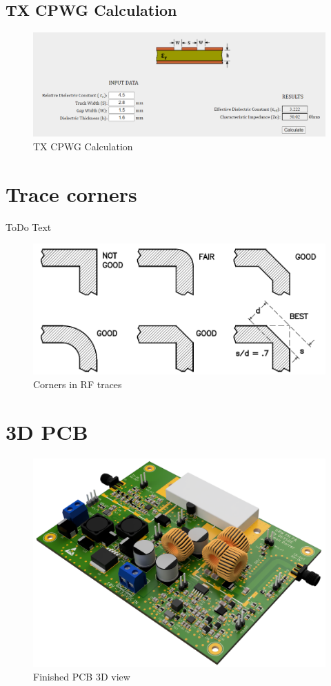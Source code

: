 \subsection{TX CPWG Calculation}
	\begin{figure}[ht!]
		\centering
		\includegraphics[width = 15cm]{./3_pcb/fig/CPWG_TX}
		\caption{TX CPWG Calculation}
		\label{fig:TX_CPWG}
	\end{figure}

\newpage
\section{Trace corners}	
	ToDo Text
	\begin{figure}[ht!]
		\centering
		\includegraphics[width = 13cm]{./3_pcb/fig/Trace Corners}
		\caption{Corners in RF traces}
		\label{fig:Corners}
	\end{figure}

\section{3D PCB}	
	\begin{figure}[ht!]
		\centering
		\includegraphics[width = 15cm]{./3_pcb/fig/3D-PCB}
		\caption{Finished \acs{PCB} 3D view}
		\label{fig:3D-PCB}
	\end{figure}

